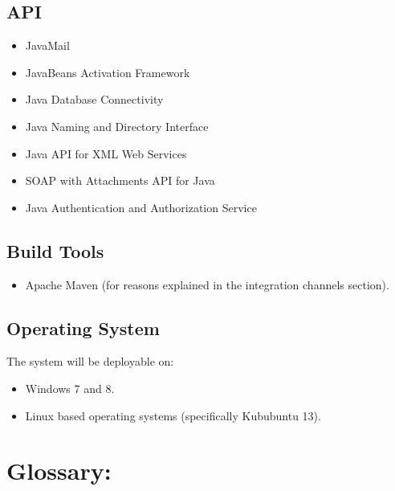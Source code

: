 \documentclass[12pt]{article}
\begin{document}
\subsection*{API}
\begin{itemize}
\item JavaMail
\item JavaBeans Activation Framework
\item Java Database Connectivity
\item Java Naming and Directory Interface
\item Java API for XML Web Services
\item SOAP with Attachments API for Java
\item Java Authentication and Authorization Service
\end{itemize}

\subsection*{Build Tools}
\begin{itemize}
\item Apache Maven (for reasons explained in the integration channels section).
\end{itemize}

\subsection*{Operating System}
The system will be deployable on:
\begin{itemize}
\item Windows 7 and 8.
\item Linux based operating systems (specifically Kububuntu 13).
\end{itemize}
\newpage

\section{Glossary:} %
\vspace{0.2in}
\end{document}
